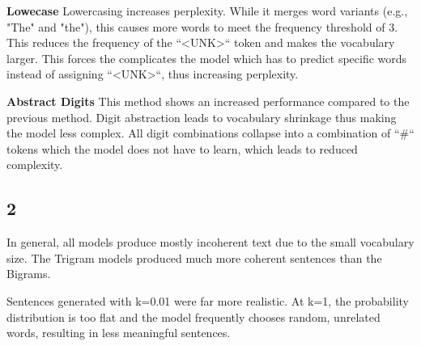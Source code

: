 \documentclass[8pt,a4paper]{report}%
\begin{document}
\textbf{Lowecase}
Lowercasing increases perplexity. While it merges word variants (e.g., "The" and "the"), this causes more words to meet the frequency threshold of 3. This reduces the frequency of the ``<UNK>`` token and makes the vocabulary larger. This forces the complicates the model which has to predict specific words instead of assigning ``<UNK>``, thus increasing perplexity.

\textbf{Abstract Digits}
This method shows an increased performance compared to the previous method. Digit abstraction leads to vocabulary shrinkage thus making the model less complex. All digit combinations collapse into a combination of ``\#`` tokens which the model does not have to learn, which leads to reduced complexity.

\subsection*{2}

In general, all models produce mostly incoherent text due to the small vocabulary size. The Trigram models produced much more coherent sentences than the Bigrams.

Sentences generated with k=0.01 were far more realistic. At k=1, the probability distribution is too flat and the model frequently chooses random, unrelated words, resulting in less meaningful sentences.

        
\end{document}
